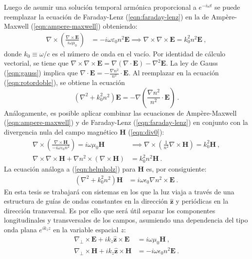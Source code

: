 Luego de asumir una solución temporal armónica proporcional a $e^{-i\omega t}$ se puede reemplazar la ecuación de Faraday-Lenz (\ref{eqn:faraday-lenz}) en la de Ampère-Maxwell (\ref{eqn:ampere-maxwell}) obteniendo:
\begin{align}
	\nabla\times\left(\frac{\nabla\times\textbf{E}}{i\omega\mu_0}\right) &= -i\omega \varepsilon_0 n^2 \textbf{E} \implies \nabla\times\nabla\times\textbf{E} = k_0^2n^2\textbf{E} \ , \label{eqn:rotordoble}
\end{align}
donde $k_0 \equiv \omega/c$ es el número de onda en el vacío. Por identidad de cálculo vectorial, se tiene que $\nabla\times\nabla\times\textbf{E} = \nabla(\nabla\cdot\textbf{E}) - \nabla^2\textbf{E}$. La ley de Gauss (\ref{eqn:gauss}) implica que $\nabla\cdot \textbf{E} = -\frac{\nabla n^2}{n^2}\cdot\textbf{E}$. Al reemplazar en la ecuación (\ref{eqn:rotordoble}), se obtiene la ecuación 
\begin{equation}
	\left(\nabla^2  + k_0^2n^2\right)\textbf{E} = -\nabla\left( \frac{\nabla n^2}{n^2} \cdot \textbf{E}  \right) \ . \label{eqn:helmholz}
\end{equation}
Análogamente, es posible aplicar combinar las ecuaciones de Ampère-Maxwell (\ref{eqn:ampere-maxwell}) y de Faraday-Lenz (\ref{eqn:faraday-lenz}) en conjunto con la divergencia nula del campo magnético \textbf{H} (\ref{eqn:div0}):
\begin{align}
	\nabla\times \left(\frac{\nabla\times\textbf{H}}{-i\omega \varepsilon_0 n^2}\right) = i\omega \mu_0 \textbf{H} &\implies \nabla\times \left(\frac{1}{n^2}\nabla\times\textbf{H}\right) = k_0^2 \textbf{H} \ ,
	\nonumber
	\\
	\nabla\times\nabla\times\textbf{H} + \nabla n^2 \times \left( \nabla\times\textbf{H}\right)
	&= 
	  k_0^2 n^2\textbf{H} \ .
	 	\nonumber
\end{align}
La ecuación análoga a (\ref{eqn:helmholz}) para \textbf{H} es, por consiguiente:
\begin{align}
	 \left(\nabla^2  + k_0^2 n^2 \right) \textbf{H} &= i\omega \epsilon_0 \nabla n^2 \times \textbf{E} \ .
	 \label{eqn:helmholzH}
\end{align}
En esta tesis se trabajará con sistemas en los que la luz viaja a través de una estructura de guías de ondas constantes en la dirección $\hat{\textbf{z}}$ y periódicas en la dirección transversal. Es por ello que será útil separar los componentes longitudinales y transversales de los campos, asumiendo una dependencia del tipo onda plana $e^{i k_z z}$ en la variable espacial $z$:
\begin{align}
	\nabla_\perp \times  \textbf{E} + ik_z \hat{\textbf{z}} \times \textbf{E} &= i\omega\mu_0\textbf{H} \ ,
	\label{eqn:EfieldH}
	\\
	\nabla_\perp \times  \textbf{H} + ik_z \hat{\textbf{z}} \times \textbf{H} &= -i\omega \epsilon_0 n^2 \textbf{E} \ .
	\label{eqn:HfieldE}
\end{align}
